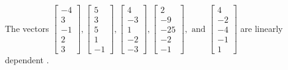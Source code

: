 \begin{exercise}
\begin{exerciseStatement}
  \end{exerciseStatement}
  \begin{exerciseAnswer}
   The vectors \(\left[\begin{array}{r}
-4 \\
3 \\
-1 \\
2 \\
3
\end{array}\right] , \left[\begin{array}{r}
5 \\
3 \\
5 \\
1 \\
-1
\end{array}\right] , \left[\begin{array}{r}
4 \\
-3 \\
1 \\
-2 \\
-3
\end{array}\right] , \left[\begin{array}{r}
2 \\
-9 \\
-25 \\
-2 \\
-1
\end{array}\right] , \text{ and } \left[\begin{array}{r}
4 \\
-2 \\
-4 \\
-1 \\
1
\end{array}\right]\) are 
  	 linearly dependent  .
  


  \end{exerciseAnswer}
\end{exercise}